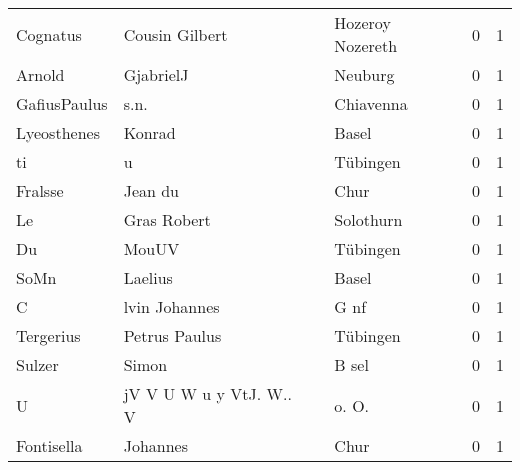 \documentclass[10pt,a4paper,landscape]{article}
\begin{document}
\begin{longtable}{llllrr}
                 Cognatus &                     Cousin Gilbert &             &                            Hozeroy Nozereth &          0 &         1 \\
                   Arnold &                          GjabrielJ &             &                                     Neuburg &          0 &         1 \\
             GafiusPaulus &                               s.n. &             &                                   Chiavenna &          0 &         1 \\
              Lyeosthenes &                             Konrad &             &                                       Basel &          0 &         1 \\
                       ti &                                  u &             &                                    Tübingen &          0 &         1 \\
                  Fralsse &                            Jean du &             &                                        Chur &          0 &         1 \\
                       Le &                        Gras Robert &             &                                   Solothurn &          0 &         1 \\
                       Du &                              MouUV &             &                                    Tübingen &          0 &         1 \\
                     SoMn &                            Laelius &             &                                       Basel &          0 &         1 \\
                        C &                      lvin Johannes &             &                                        G nf &          0 &         1 \\
                Tergerius &                      Petrus Paulus &             &                                    Tübingen &          0 &         1 \\
                   Sulzer &                              Simon &             &                                       B sel &          0 &         1 \\
                        U &            jV V U W u y VtJ. W.. V &             &                                      o. O.  &          0 &         1 \\
               Fontisella &                           Johannes &             &                                        Chur &          0 &         1 \\

\end{longtable}
\end{document}

